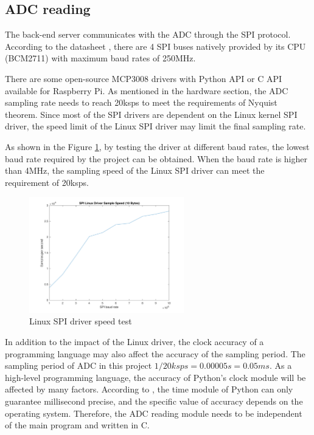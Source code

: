\subsection{ADC reading}
The back-end server communicates with the ADC through the SPI protocol. According to the datasheet  \textcite{raspberrypi}, there are 4 SPI buses natively provided by its CPU (BCM2711) with maximum baud rates of 250MHz. 
\par
There are some open-source MCP3008 drivers with Python API or C API available for Raspberry Pi. As mentioned in the hardware section, the ADC sampling rate needs to reach 20ksps to meet the requirements of Nyquist theorem. Since most of the SPI drivers are dependent on the Linux kernel SPI driver, the speed limit of the Linux SPI driver may limit the final sampling rate.
\par
As shown in the Figure \ref{fig:spi}, by testing the driver at different baud rates, the lowest baud rate required by the project can be obtained. When the baud rate is higher than 4MHz, the sampling speed of the Linux SPI driver can meet the requirement of 20ksps.
\begin{figure}[H]
    \centering
    \includegraphics[width=0.6\textwidth]{figure/spi_linux.pdf}
    \caption{Linux SPI driver speed test}
    \label{fig:spi}
\end{figure}
In addition to the impact of the Linux driver, the clock accuracy of a programming language may also affect the accuracy of the sampling period. The sampling period of ADC in this project $ 1/20ksps=0.00005s=0.05ms$. As a high-level programming language, the accuracy of Python’s clock module will be affected by many factors. According to \textcite{python}, the time module of Python can only guarantee millisecond precise, and the specific value of accuracy depends on the operating system. Therefore, the ADC reading module needs to be independent of the main program and written in C.
\par
